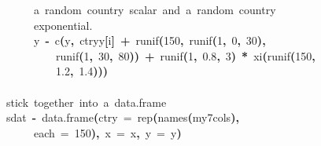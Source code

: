 \documentclass[a4paper]{article}
\newcommand{\hlnumber}[1]{\textcolor[rgb]{0.0823529411764706,0.0784313725490196,0.709803921568627}{#1}}%
\newcommand{\hlfunctioncall}[1]{\textcolor[rgb]{1,0,0}{#1}}%
\newcommand{\hlkeyword}[1]{\textcolor[rgb]{0,0,0}{\textbf{#1}}}%
\newcommand{\hlargument}[1]{\textcolor[rgb]{0.694117647058824,0.247058823529412,0.0196078431372549}{#1}}%
\newcommand{\hlcomment}[1]{\textcolor[rgb]{0.8,0.8,0.8}{#1}}%
\newcommand{\hlassignement}[1]{\textcolor[rgb]{0.215686274509804,0.215686274509804,0.384313725490196}{\textbf{#1}}}%
\newcommand{\hlsymbol}[1]{\textcolor[rgb]{0,0,0}{#1}}%
\newcommand{\hlprompt}[1]{\textcolor[rgb]{0,0,0}{#1}}%
\newcommand{\hlstd}[1]{\textcolor[rgb]{0,0,0}{#1}}%
\newenvironment{Houtput}{\raggedright}{%
%
}
\begin{document}
\begin{Houtput}
\hlstd{}\hlprompt{{\ }}{\ }{\ }{\ }{\ }\hlcomment{\usebox{\hlnormalsizeboxhash}{\ }a{\ }random{\ }country{\ }scalar{\ }and{\ }a{\ }random{\ }country}\hspace*{\fill}\\
\hlstd{}\hlprompt{{\ }}{\ }{\ }{\ }{\ }\hlcomment{\usebox{\hlnormalsizeboxhash}{\ }{\ }{\ }exponential.}\hspace*{\fill}\\
\hlstd{}\hlprompt{{\ }}{\ }{\ }{\ }{\ }\hlsymbol{y}{\ }\hlassignement{\usebox{\hlnormalsizeboxlessthan}-}{\ }\hlfunctioncall{c}\hlkeyword{(}\hlsymbol{y}\hlkeyword{,}{\ }\hlsymbol{ctry\usebox{\hlnormalsizeboxunderscore}y}\hlkeyword{[}\hlsymbol{i}\hlkeyword{]}{\ }\hlkeyword{+}{\ }\hlfunctioncall{runif}\hlkeyword{(}\hlnumber{150}\hlkeyword{,}{\ }\hlfunctioncall{runif}\hlkeyword{(}\hlnumber{1}\hlkeyword{,}{\ }\hlnumber{0}\hlkeyword{,}{\ }\hlnumber{30}\hlkeyword{)}\hlkeyword{,}\hspace*{\fill}\\
\hlstd{}\hlprompt{{\ }}{\ }{\ }{\ }{\ }{\ }{\ }{\ }{\ }\hlfunctioncall{runif}\hlkeyword{(}\hlnumber{1}\hlkeyword{,}{\ }\hlnumber{30}\hlkeyword{,}{\ }\hlnumber{80}\hlkeyword{)}\hlkeyword{)}{\ }\hlkeyword{+}{\ }\hlfunctioncall{runif}\hlkeyword{(}\hlnumber{1}\hlkeyword{,}{\ }\hlnumber{0.8}\hlkeyword{,}{\ }\hlnumber{3}\hlkeyword{)}{\ }\hlkeyword{*}{\ }\hlsymbol{xi}\hlkeyword{\usebox{\hlnormalsizeboxhat}}\hlkeyword{(}\hlfunctioncall{runif}\hlkeyword{(}\hlnumber{150}\hlkeyword{,}\hspace*{\fill}\\
\hlstd{}\hlprompt{{\ }}{\ }{\ }{\ }{\ }{\ }{\ }{\ }{\ }\hlnumber{1.2}\hlkeyword{,}{\ }\hlnumber{1.4}\hlkeyword{)}\hlkeyword{)}\hlkeyword{)}\hspace*{\fill}\\
\hlstd{}\hlprompt{{\ }}\hlkeyword{\usebox{\hlnormalsizeboxclosebrace}}\mbox{}
\normalfont
\hspace*{\fill}\\
\hlstd{}\ttfamily\noindent
\hlprompt{\usebox{\hlnormalsizeboxgreaterthan}{\ }}\hlcomment{\usebox{\hlnormalsizeboxhash}{\ }stick{\ }together{\ }into{\ }a{\ }data.frame}\mbox{}
\normalfont
\hspace*{\fill}\\
\hlstd{}\ttfamily\noindent
\hlprompt{\usebox{\hlnormalsizeboxgreaterthan}{\ }}\hlsymbol{sdat}{\ }\hlassignement{\usebox{\hlnormalsizeboxlessthan}-}{\ }\hlfunctioncall{data.frame}\hlkeyword{(}\hlargument{ctry}{\ }\hlargument{=}{\ }\hlfunctioncall{rep}\hlkeyword{(}\hlfunctioncall{names}\hlkeyword{(}\hlsymbol{my7cols}\hlkeyword{)}\hlkeyword{,}\hspace*{\fill}\\
\hlstd{}\hlprompt{{\ }}{\ }{\ }{\ }{\ }\hlargument{each}{\ }\hlargument{=}{\ }\hlnumber{150}\hlkeyword{)}\hlkeyword{,}{\ }\hlargument{x}{\ }\hlargument{=}{\ }\hlsymbol{x}\hlkeyword{,}{\ }\hlargument{y}{\ }\hlargument{=}{\ }\hlsymbol{y}\hlkeyword{)}\mbox{}
\normalfont
\hspace*{\fill}\\
\hlstd{}
\end{Houtput}
\end{document}

